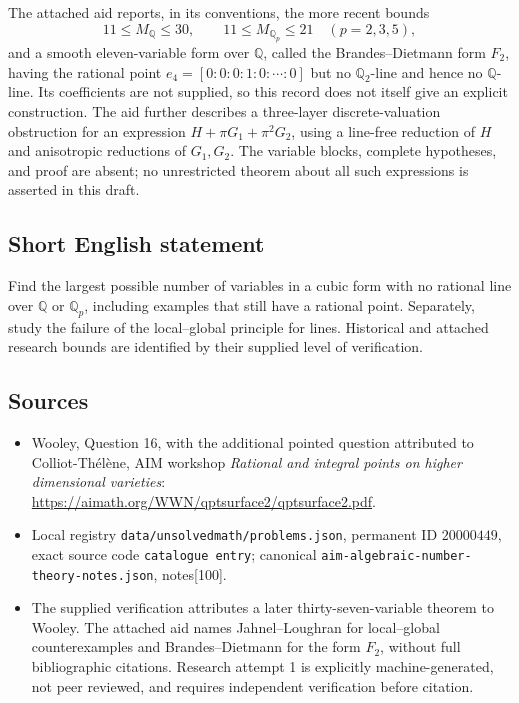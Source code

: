 \documentclass[11pt]{article}
\newcommand{\Q}{\mathbb{Q}}
\begin{document}
The attached aid reports, in its conventions, the more recent bounds
\[
11\leq M_\Q\leq30,\qquad
11\leq M_{\Q_p}\leq21\quad(p=2,3,5),
\]
and a smooth eleven-variable form over \(\Q\), called the Brandes--Dietmann form \(F_2\), having the rational point \(e_4=[0:0:0:1:0:\cdots:0]\) but no \(\Q_2\)-line and hence no \(\Q\)-line. Its coefficients are not supplied, so this record does not itself give an explicit construction. The aid further describes a three-layer discrete-valuation obstruction for an expression \(H+\pi G_1+\pi^2G_2\), using a line-free reduction of \(H\) and anisotropic reductions of \(G_1,G_2\). The variable blocks, complete hypotheses, and proof are absent; no unrestricted theorem about all such expressions is asserted in this draft.
\subsection{Short English statement}
Find the largest possible number of variables in a cubic form with no rational line over \(\Q\) or \(\Q_p\), including examples that still have a rational point. Separately, study the failure of the local--global principle for lines. Historical and attached research bounds are identified by their supplied level of verification.
\subsection{Sources}
\begin{itemize}
\item Wooley, Question 16, with the additional pointed question attributed to Colliot-Th\'el\`ene, AIM workshop \emph{Rational and integral points on higher dimensional varieties}: \url{https://aimath.org/WWN/qptsurface2/qptsurface2.pdf}.
\item Local registry \texttt{data/unsolvedmath/problems.json}, permanent ID \(20000449\), exact source code \texttt{catalogue entry}; canonical \texttt{aim-algebraic-number-theory-notes.json}, notes[100].
\item The supplied verification attributes a later thirty-seven-variable theorem to Wooley. The attached aid names Jahnel--Loughran for local--global counterexamples and Brandes--Dietmann for the form \(F_2\), without full bibliographic citations. Research attempt 1 is explicitly machine-generated, not peer reviewed, and requires independent verification before citation.
\end{itemize}
\end{document}

